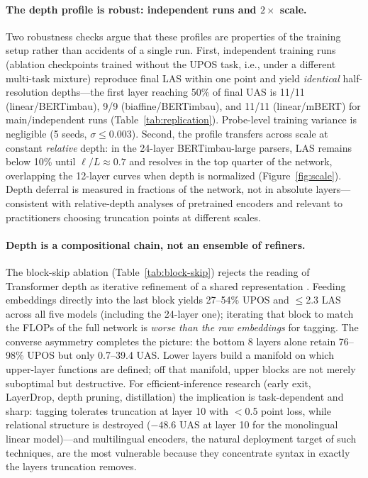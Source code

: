 \paragraph{The depth profile is robust: independent runs and $2\times$ scale.}
Two robustness checks argue that these profiles are properties of the training
setup rather than accidents of a single run. First, independent training runs
(ablation checkpoints trained without the UPOS task, i.e., under a different
multi-task mixture) reproduce final LAS within one point and yield
\emph{identical} half-resolution depths---the first layer reaching 50\% of
final UAS is 11/11 (linear/BERTimbau), 9/9 (biaffine/BERTimbau), and 11/11
(linear/mBERT) for main/independent runs (Table~\ref{tab:replication}).
Probe-level training variance is negligible (5 seeds, $\sigma \leq 0.003$).
Second, the profile transfers across scale at constant \emph{relative} depth:
in the 24-layer BERTimbau-large parsers, LAS remains below 10\% until
$\ell/L \approx 0.7$ and resolves in the top quarter of the network,
overlapping the 12-layer curves when depth is normalized
(Figure~\ref{fig:scale}). Depth deferral is measured in fractions of the
network, not in absolute layers---consistent with relative-depth analyses of
pretrained encoders and relevant to practitioners choosing truncation points
at different scales.

\paragraph{Depth is a compositional chain, not an ensemble of refiners.}
The block-skip ablation (Table~\ref{tab:block-skip}) rejects the reading of
Transformer depth as iterative refinement of a shared representation
\citep{jastrzebski2018residual}. Feeding embeddings directly into the last
block yields 27--54\% UPOS and $\leq$2.3 LAS across all five models (including
the 24-layer one); iterating that block to match the FLOPs of the full network
is \emph{worse than the raw embeddings} for tagging. The converse asymmetry
completes the picture: the bottom 8 layers alone retain 76--98\% UPOS but only
0.7--39.4 UAS. Lower layers build a manifold on which upper-layer functions
are defined; off that manifold, upper blocks are not merely suboptimal but
destructive. For efficient-inference research (early exit, LayerDrop, depth
pruning, distillation) the implication is task-dependent and sharp: tagging
tolerates truncation at layer 10 with $<$0.5 point loss, while relational
structure is destroyed ($-48.6$ UAS at layer 10 for the monolingual linear
model)---and multilingual encoders, the natural deployment target of such
techniques, are the most vulnerable because they concentrate syntax in
exactly the layers truncation removes.

